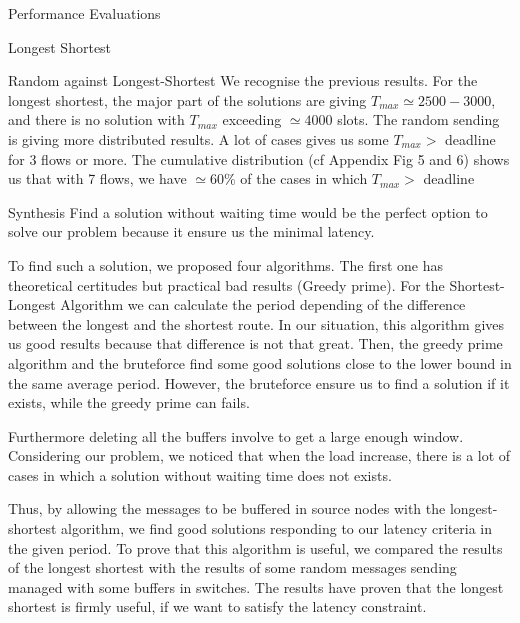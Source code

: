 \documentclass[a4paper,10pt]{report}
\begin{document}
\begin{chapter}{Performance Evaluations}
\begin{section}{Longest Shortest}
\begin{subsection}{Random against Longest-Shortest}
We recognise the previous results. For the longest shortest, the major part of the solutions are giving $T_{max} \simeq 2500-3000$, and there is no
solution with $T_{max}$ exceeding $\simeq 4000$ slots.
The random sending is giving more distributed results. A lot of cases gives us some $T_{max} >$ deadline for 3 flows or more.
The cumulative distribution (cf Appendix Fig 5 and 6) shows us that with 7 flows, we have $\simeq 60\%$ of the cases in which $T_{max} >$ deadline


\end{subsection}

\end{section}

\begin{section}{Synthesis}
Find a solution without waiting time would be the perfect option to solve our problem because it ensure us the minimal latency.

To find such a solution, we proposed four algorithms. The first one has theoretical certitudes but practical bad results (Greedy prime).
For the Shortest-Longest Algorithm we can calculate the period depending of the difference between the longest and the shortest route.
In our situation, this algorithm gives us good results because that difference is not that great.
Then, the greedy prime algorithm and the bruteforce find some good solutions close to the lower bound in the same average period.
However, the bruteforce ensure us to find a solution if it exists, while the greedy prime can fails.

Furthermore deleting all the buffers involve to get a large enough window. Considering our problem, we noticed that when the 
load increase, there is a lot of cases in which a solution without waiting time does not exists.

Thus, by allowing the messages to be buffered in source nodes with the longest-shortest algorithm, we find good solutions responding to our latency 
criteria in the given period. To prove that this algorithm is useful, we compared the results of the longest shortest with the results of some
random messages sending managed with some buffers in switches. The results have proven that the longest shortest is firmly useful, if we want
to satisfy the latency constraint.

\end{section}

\end{chapter}
\end{document}

